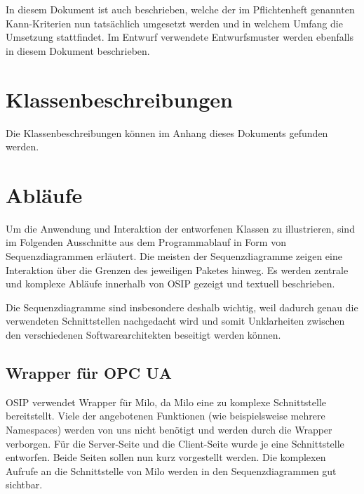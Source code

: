 \documentclass[parskip=full]{scrartcl}
\begin{document}
In diesem Dokument ist auch beschrieben, welche der im Pflichtenheft genannten Kann-Kriterien nun tatsächlich
umgesetzt werden und in welchem Umfang die Umsetzung stattfindet. Im Entwurf verwendete Entwurfsmuster werden
ebenfalls in diesem Dokument beschrieben.

\section{Klassenbeschreibungen}
Die Klassenbeschreibungen können im Anhang dieses Dokuments gefunden werden.

\section{Abläufe}
Um die Anwendung und Interaktion der entworfenen Klassen zu illustrieren, sind im Folgenden Ausschnitte aus dem Programmablauf
in Form von Sequenzdiagrammen erläutert. Die meisten der Sequenzdiagramme zeigen eine Interaktion über die Grenzen
des jeweiligen Paketes hinweg. Es werden zentrale und komplexe Abläufe innerhalb von OSIP gezeigt und textuell beschrieben.

Die Sequenzdiagramme sind insbesondere deshalb wichtig, weil dadurch genau die verwendeten Schnittstellen nachgedacht wird
und somit Unklarheiten zwischen den verschiedenen Softwarearchitekten beseitigt werden können.

\subsection{Wrapper für OPC UA}
OSIP verwendet Wrapper für Milo, da Milo eine zu komplexe Schnittstelle bereitstellt.
Viele der angebotenen Funktionen (wie beispielsweise mehrere Namespaces) werden von uns nicht benötigt
und werden durch die Wrapper verborgen. Für die Server-Seite und die Client-Seite wurde je eine Schnittstelle entworfen.
Beide Seiten sollen nun kurz vorgestellt werden. Die komplexen Aufrufe an die Schnittstelle von Milo werden in den
Sequenzdiagrammen gut sichtbar.
\end{document}
